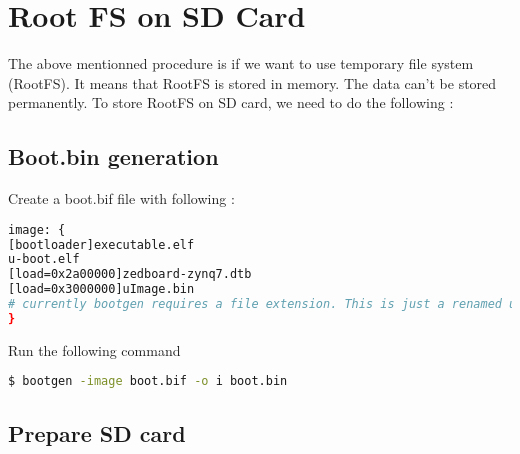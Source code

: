 \section{Root FS on SD Card}
The above mentionned procedure is if we want to use temporary file system (RootFS). It means that RootFS is stored in memory. The data can't be stored permanently. To store RootFS on SD card, we need to do the following : 

\subsection{Boot.bin generation}

Create a boot.bif file with following :\\
\begin{lstlisting}[language=bash]
image: {
[bootloader]executable.elf
u-boot.elf
[load=0x2a00000]zedboard-zynq7.dtb
[load=0x3000000]uImage.bin
# currently bootgen requires a file extension. This is just a renamed uImage
}
\end{lstlisting}
Run the following command
\begin{lstlisting}[language=bash]
$ bootgen -image boot.bif -o i boot.bin
\end{lstlisting}

\subsection{Prepare SD card}

